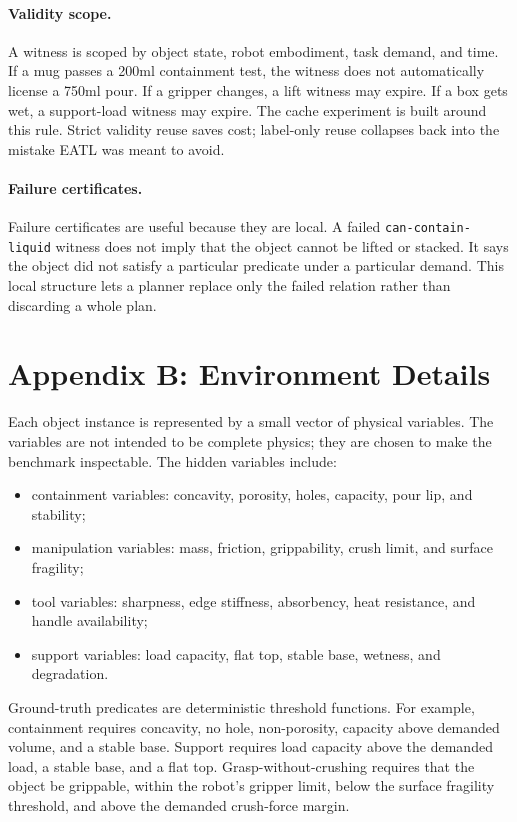 \documentclass{article}
\begin{document}
\paragraph{Validity scope.}
A witness is scoped by object state, robot embodiment, task demand, and time.
If a mug passes a 200ml containment test, the witness does not automatically
license a 750ml pour.  If a gripper changes, a lift witness may expire.  If a
box gets wet, a support-load witness may expire.  The cache experiment is built
around this rule.  Strict validity reuse saves cost; label-only reuse collapses
back into the mistake EATL was meant to avoid.

\paragraph{Failure certificates.}
Failure certificates are useful because they are local.  A failed
\texttt{can-contain-liquid} witness does not imply that the object cannot be
lifted or stacked.  It says the object did not satisfy a particular predicate
under a particular demand.  This local structure lets a planner replace only the
failed relation rather than discarding a whole plan.

\section{Appendix B: Environment Details}

Each object instance is represented by a small vector of physical variables.
The variables are not intended to be complete physics; they are chosen to make
the benchmark inspectable.  The hidden variables include:

\begin{itemize}
\item containment variables: concavity, porosity, holes, capacity, pour lip,
and stability;
\item manipulation variables: mass, friction, grippability, crush limit, and
surface fragility;
\item tool variables: sharpness, edge stiffness, absorbency, heat resistance,
and handle availability;
\item support variables: load capacity, flat top, stable base, wetness, and
degradation.
\end{itemize}

Ground-truth predicates are deterministic threshold functions.  For example,
containment requires concavity, no hole, non-porosity, capacity above demanded
volume, and a stable base.  Support requires load capacity above the demanded
load, a stable base, and a flat top.  Grasp-without-crushing requires that the
object be grippable, within the robot's gripper limit, below the surface
fragility threshold, and above the demanded crush-force margin.
\end{document}
